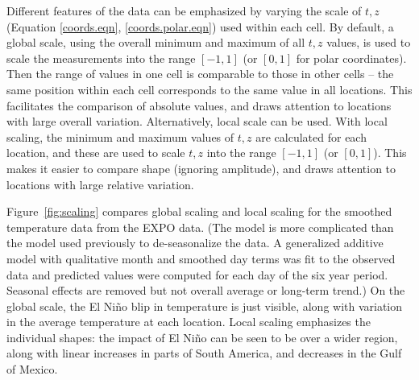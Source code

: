 \documentclass[oneside]{article}
\begin{document}
Different features of the data can be emphasized by varying the scale of $t, z$ (Equation \ref{coords.eqn}, \ref{coords.polar.eqn}) used within each cell. By default, a global scale, using the overall minimum and maximum of all $t, z$ values, is used to scale the measurements into the range $[-1, 1]$ (or $[0, 1]$ for polar coordinates). Then the range of values in one cell is comparable to those in other cells -- the same position within each cell corresponds to the same value in all locations. This facilitates the comparison of absolute values, and draws attention to locations with large overall variation. Alternatively, local scale can be used. With local scaling, the minimum and maximum values of $t, z$ are calculated for each location, and these are used to scale $t, z$ into the range $[-1, 1]$ (or $[0, 1]$). This makes it easier to compare shape (ignoring amplitude), and draws attention to locations with large relative variation. 

Figure~\ref{fig:scaling} compares global scaling and local scaling for the smoothed temperature data from the EXPO data. (The model is more complicated than the model used previously to de-seasonalize the data. A generalized additive model \citep{wood:2006} with qualitative month and smoothed day terms was fit to the observed data and predicted values were computed for each day of the six year period. Seasonal effects are removed but not overall average or long-term trend.) On the global scale, the El Ni\~no blip in temperature is just visible, along with variation in the average temperature at each location. Local scaling emphasizes the individual shapes: the impact of El Ni\~no can be seen to be over a wider region, along with linear increases in parts of South America, and decreases in the Gulf of Mexico.
\end{document}
